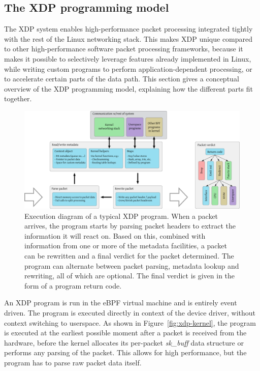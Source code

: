 \documentclass[10pt,sigconf]{acmart}
\begin{document}
\subsection{The XDP programming model}
\label{sec:prog-model}
The XDP system enables high-performance packet processing integrated tightly
with the rest of the Linux networking stack. This makes XDP unique compared to
other high-performance software packet processing frameworks, because it makes
it possible to selectively leverage features already implemented in Linux, while
writing custom programs to perform application-dependent processing, or to
accelerate certain parts of the data path. This section gives a conceptual
overview of the XDP programming model, explaining how the different parts fit
together.

\begin{figure}[t]
\centering
\includegraphics[width=\linewidth]{figures/xdp-execution-diagram.pdf}
\caption{\label{fig:xdp-execution} Execution diagram of a typical XDP program.
  When a packet arrives, the program starts by parsing packet headers to extract
  the information it will react on. Based on this, combined with information
  from one or more of the metadata facilities, a packet can be rewritten and a
  final verdict for the packet determined. The program can alternate between
  packet parsing, metadata lookup and rewriting, all of which are optional. The
  final verdict is given in the form of a program return code.}
\end{figure}


An XDP program is run in the eBPF virtual machine and is entirely event driven.
The program is executed directly in context of the device driver, without
context switching to userspace. As shown in Figure~\ref{fig:xdp-kernel}, the
program is executed at the earliest possible moment after a packet is received
from the hardware, before the kernel allocates its per-packet \emph{sk\_buff}
data structure or performs any parsing of the packet. This allows for high
performance, but the program has to parse raw packet data itself.
\end{document}
